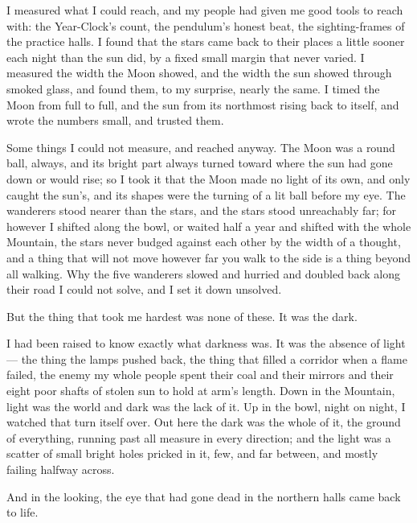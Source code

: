 I measured what I could reach, and my people had given me good tools to reach with: the Year-Clock's count, the pendulum's honest beat, the sighting-frames of the practice halls. I found that the stars came back to their places a little sooner each night than the sun did, by a fixed small margin that never varied. I measured the width the Moon showed, and the width the sun showed through smoked glass, and found them, to my surprise, nearly the same. I timed the Moon from full to full, and the sun from its northmost rising back to itself, and wrote the numbers small, and trusted them.\par

Some things I could not measure, and reached anyway. The Moon was a round ball, always, and its bright part always turned toward where the sun had gone down or would rise; so I took it that the Moon made no light of its own, and only caught the sun's, and its shapes were the turning of a lit ball before my eye. The wanderers stood nearer than the stars, and the stars stood unreachably far; for however I shifted along the bowl, or waited half a year and shifted with the whole Mountain, the stars never budged against each other by the width of a thought, and a thing that will not move however far you walk to the side is a thing beyond all walking. Why the five wanderers slowed and hurried and doubled back along their road I could not solve, and I set it down unsolved.\par

But the thing that took me hardest was none of these. It was the dark.\par

I had been raised to know exactly what darkness was. It was the absence of light --- the thing the lamps pushed back, the thing that filled a corridor when a flame failed, the enemy my whole people spent their coal and their mirrors and their eight poor shafts of stolen sun to hold at arm's length. Down in the Mountain, light was the world and dark was the lack of it. Up in the bowl, night on night, I watched that turn itself over. Out here the dark was the whole of it, the ground of everything, running past all measure in every direction; and the light was a scatter of small bright holes pricked in it, few, and far between, and mostly failing halfway across. \par

And in the looking, the eye that had gone dead in the northern halls came back to life.\par

